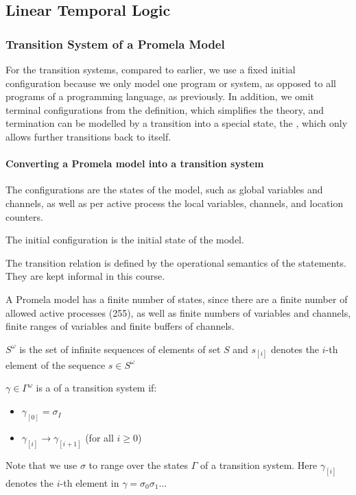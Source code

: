 \newpage
\subsection{Linear Temporal Logic}
\subsubsection{Transition System of a Promela Model}
For the transition systems, compared to earlier, we use a fixed initial configuration because we only model one program or system,
as opposed to all programs of a programming language, as previously.
In addition, we omit terminal configurations from the definition, which simplifies the theory, and termination can be modelled by a transition into a special state,
the , which only allows further transitions back to itself.


\paragraph{Converting a Promela model into a transition system}

The configurations are the states of the model, such as global variables and channels, as well as per active process the local variables, channels, and location counters.

The initial configuration is the initial state of the model.

The transition relation is defined by the operational semantics of the statements. They are kept informal in this course.

A Promela model has a finite number of states, since there are a finite number of allowed active processes (255), as well as finite numbers of variables and channels,
finite ranges of variables and finite buffers of channels.



$S^\omega$ is the set of infinite sequences of elements of set $S$ and $s_{[i]}$ denotes the $i$-th element of the sequence $s \in S^\omega$

$\gamma \in \Gamma^\omega$ is a  of a transition system if:
\begin{itemize}
    \item $\gamma_{[0]} = \sigma_I$
    \item $\gamma_{[i]} \rightarrow \gamma_{[i + 1]}$ (for all $i \geq 0$)
\end{itemize}
Note that we use $\sigma$ to range over the states $\Gamma$ of a transition system. Here $\gamma_{[i]}$ denotes the $i$-th element in $\gamma = \sigma_0 \sigma_1 \ldots$

